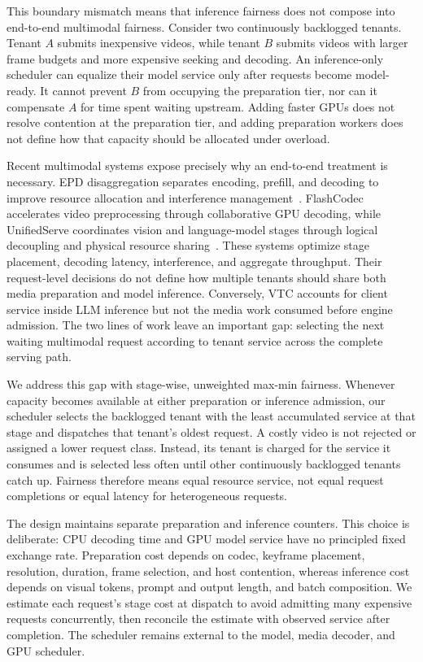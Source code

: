 \documentclass[sigplan,anonymous,review,nonacm]{acmart}
\begin{document}
This boundary mismatch means that inference fairness does not compose into
end-to-end multimodal fairness. Consider two continuously backlogged tenants.
Tenant $A$ submits inexpensive videos, while tenant $B$ submits videos with
larger frame budgets and more expensive seeking and decoding. An
inference-only scheduler can equalize their model service only after requests
become model-ready. It cannot prevent $B$ from occupying the preparation tier,
nor can it compensate $A$ for time spent waiting upstream. Adding faster GPUs
does not resolve contention at the preparation tier, and adding preparation
workers does not define how that capacity should be allocated under overload.

Recent multimodal systems expose precisely why an end-to-end treatment is
necessary. EPD disaggregation separates encoding, prefill, and decoding to
improve resource allocation and interference management~\cite{singh2025epd}.
FlashCodec accelerates video preprocessing through collaborative GPU decoding,
while UnifiedServe coordinates vision and language-model stages through
logical decoupling and physical resource sharing~\cite{zhao2025flashcodec}.
These systems optimize stage placement, decoding latency, interference, and
aggregate throughput. Their request-level decisions do not define how multiple
tenants should share both media preparation and model inference. Conversely,
VTC accounts for client service inside LLM inference but not the media work
consumed before engine admission. The two lines of work leave an important
gap: selecting the next waiting multimodal request according to tenant service
across the complete serving path.

We address this gap with stage-wise, unweighted max-min fairness. Whenever
capacity becomes available at either preparation or inference admission, our
scheduler selects the backlogged tenant with the least accumulated service at
that stage and dispatches that tenant's oldest request. A costly video is not
rejected or assigned a lower request class. Instead, its tenant is charged for
the service it consumes and is selected less often until other continuously
backlogged tenants catch up. Fairness therefore means equal resource service,
not equal request completions or equal latency for heterogeneous requests.

The design maintains separate preparation and inference counters. This choice
is deliberate: CPU decoding time and GPU model service have no principled
fixed exchange rate. Preparation cost depends on codec, keyframe placement,
resolution, duration, frame selection, and host contention, whereas inference
cost depends on visual tokens, prompt and output length, and batch composition.
We estimate each request's stage cost at dispatch to avoid admitting many
expensive requests concurrently, then reconcile the estimate with observed
service after completion. The scheduler remains external to the model, media
decoder, and GPU scheduler.
\end{document}
